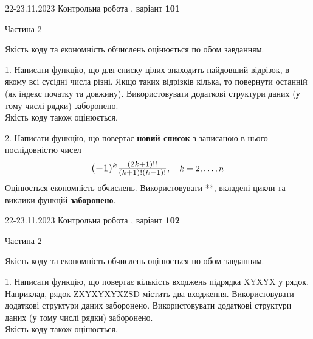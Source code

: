 \documentclass[12pt, ukrainian]{article}
\begin{document}
\begin {Huge}
{{22-23.11.2023 Контрольна робота , варіант  \No \textbf { 101 }\par}}

\begin{center}Частина 2
\end{center}
\vspace{10mm}
\end {Huge}

{
\begin {Large}
Якість коду та економність обчислень оцінюється по обом завданням.

\vspace{5mm}

1. Написати функцію, що для списку цілих знаходить найдовший відрізок, в якому всі сусідні числа різні. Якщо таких відрізків кілька, то повернути останній (як індекс початку та довжину). Використовувати додаткові структури даних (у тому числі рядки) заборонено.\\	Якість коду також оцінюється. 



\vspace{10mm}



2. 
Написати функцію, що повертає \textbf{новий список} з записаною в нього послідовністю чисел
$$\scalebox{1.2}{$(-1)^{k}\frac{(2k+1)!!}{(k+1)!(k-1)!}$}, \quad k=2,\ldots,n$$
Оцінюється економність обчислень. Використовувати **, вкладені цикли та виклики функцій \textbf{заборонено}.

\end{Large}\newpage




\begin {Huge}
{{22-23.11.2023 Контрольна робота , варіант  \No \textbf { 102 }\par}}

\begin{center}Частина 2
\end{center}
\vspace{10mm}
\end {Huge}

{
\begin {Large}
Якість коду та економність обчислень оцінюється по обом завданням.

\vspace{5mm}

1. Написати функцію, що повертає кількість входжень підрядка XYXYX у рядок. Наприклад, рядок ZXYXYXYXZSD містить два входження. Використовувати додаткові структури даних заборонено. Використовувати додаткові структури даних (у тому числі рядки) заборонено.\\	Якість коду також оцінюється. 




\end{Large}}}
\end{document}
